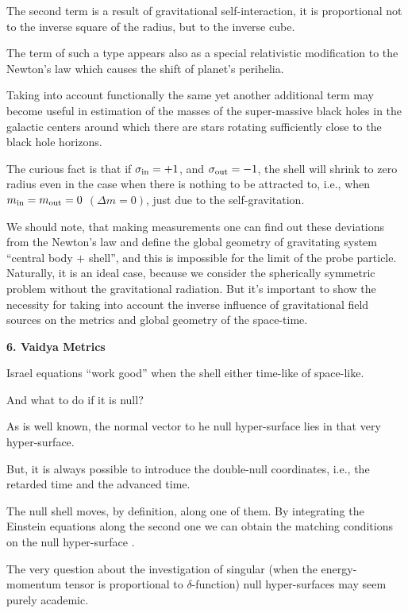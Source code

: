 The second term is a result of gravitational self-interaction, it is proportional not to the inverse square of the radius, but to the inverse cube. 

The term of such a  type appears also as a special relativistic modification to the Newton's law which causes the shift of planet's perihelia. 

Taking into account functionally the same yet another additional term may become useful in estimation of the masses of the super-massive black holes in the galactic centers around which there are stars rotating sufficiently close to the black hole horizons. 

The curious fact is that if  $\sigma_{\rm in} = + 1$, and $\sigma_{\rm out} = - 1$, the shell will shrink to zero radius even in the case when there is nothing to be attracted to, i.e., when  $m_{\rm in} = m_{\rm out} = 0$ $ (\Delta m = 0)$, just due to the self-gravitation.



We should note, that making measurements one can find out these deviations from the Newton's law and define the global geometry of gravitating system ``central body $+$ shell'', and this is impossible for the limit of the probe particle. Naturally, it is an ideal case, because we consider the spherically symmetric problem without the gravitational radiation. But it's important to show the necessity for taking into account the inverse influence of gravitational field sources on the metrics and global geometry of the space-time.



\bigskip



\textbf{6. Vaidya Metrics}



Israel equations ``work good'' when the shell either time-like of space-like. 

And what to do if it is null? 

As is well known, the normal vector to he null hyper-surface lies in that very hyper-surface. 

But, it is always possible to introduce the double-null coordinates, i.e., the retarded time and the advanced time. 

The null shell moves, by definition, along one of them. By integrating the Einstein equations along the second one we can obtain the matching conditions on the null hyper-surface \cite{berez:BKT2}. 

The very question about the investigation of singular (when the energy-momentum tensor is proportional to $\delta$-function) null hyper-surfaces may seem purely academic. 

